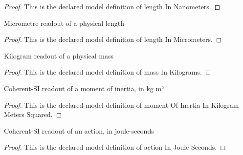 \begin{proof}
  This is the declared model definition of length In Nanometers.
\end{proof}
\begin{definition}
  \label{def:physics:phyx-mini-0571:phyxminiproblems-problemphyxmini0571-lengthinmicrometers}
  Micrometre readout of a physical length
\end{definition}
\begin{proof}
  This is the declared model definition of length In Micrometers.
\end{proof}
\begin{definition}
  \label{def:physics:phyx-mini-0571:phyxminiproblems-problemphyxmini0571-massinkilograms}
  Kilogram readout of a physical mass
\end{definition}
\begin{proof}
  This is the declared model definition of mass In Kilograms.
\end{proof}
\begin{definition}
  \label{def:physics:phyx-mini-0571:phyxminiproblems-problemphyxmini0571-momentofinertiainkilogrammeterssquared}
  Coherent-SI readout of a moment of inertia, in kg m²
\end{definition}
\begin{proof}
  This is the declared model definition of moment Of Inertia In Kilogram Meters Squared.
\end{proof}
\begin{definition}
  \label{def:physics:phyx-mini-0571:phyxminiproblems-problemphyxmini0571-actioninjouleseconds}
  Coherent-SI readout of an action, in joule-seconds
\end{definition}
\begin{proof}
  This is the declared model definition of action In Joule Seconds.
\end{proof}
